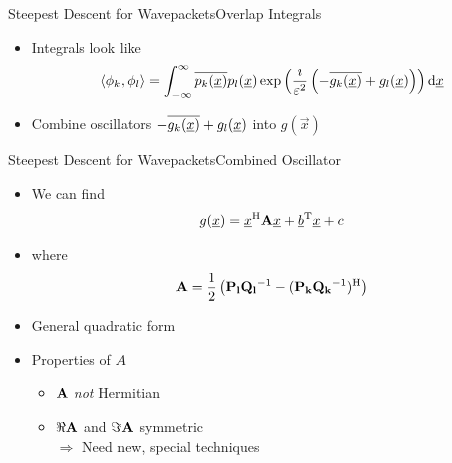 \documentclass{beamer}
\newcommand{\cemph}[1]{\emph{\color{orange} #1}}
\begin{document}
\begin{frame}{Steepest Descent for Wavepackets}{Overlap Integrals}
  \begin{itemize}
    \item Integrals look like
    \begin{equation*}
      \left\langle \phi_k , \phi_l \right\rangle =
      \int_{-\infty}^{\infty}
        \overline{p_k(\underline{x})} p_l(\underline{x})
        \exp\left(\frac{\imath}{\varepsilon^2}\left(-\overline{g_k(\underline{x})} + g_l(\underline{x})\right)\right)
      \mathrm{d}\underline{x}
    \end{equation*}
    \item Combine oscillators $-\overline{g_k(\underline{x})} + g_l(\underline{x})$ into $g(\vec{x})$
  \end{itemize}
\end{frame}


\begin{frame}{Steepest Descent for Wavepackets}{Combined Oscillator}
  \begin{itemize}
    \item We can find
    \begin{equation*}
      g(\underline{x}) = \underline{x}{}^{\textnormal{H}} \mathbf{A} \underline{x} + \underline{b}{}^{\textnormal{T}} \underline{x} + c
    \end{equation*}
    \item where
    \begin{equation*}
      \mathbf{A} = \frac{1}{2} \left(\mathbf{P_l}\mathbf{Q_l}{}^{-1} - (\mathbf{P_k}\mathbf{Q_k}{}^{-1}){}^{\textnormal{H}} \right)
    \end{equation*}
    \item General quadratic form
    \item Properties of $A$
    \begin{itemize}
      \item $\mathbf{A}$ \cemph{not} Hermitian
      \item $\Re \mathbf{A}$ and $\Im \mathbf{A}$ symmetric
      \\[0.1cm]$\Rightarrow$ Need new, special techniques
    \end{itemize}
  \end{itemize}
\end{frame}
\end{document}
